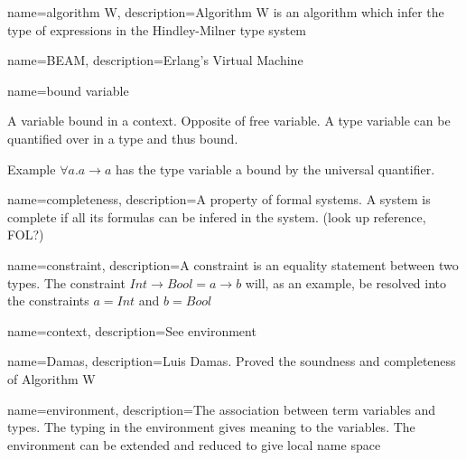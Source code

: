 
%


%




{ name={algorithm W},
  description={Algorithm W is an algorithm which infer the type of expressions in the Hindley-Milner type system}
}

{ name={BEAM},
  description={Erlang's Virtual Machine}
}

{ name={bound variable} }
{A variable bound in a context. Opposite of free variable. A type variable can be quantified over in a type and thus bound.

Example $\forall a . a \to a$ has the type variable a bound by the universal quantifier.}


{ name={completeness},
  description={A property of formal systems. A system is complete if all its formulas can be infered in the system.
(look up reference, FOL?)}
}

{ name={constraint},
  description={A constraint is an equality statement between two types. The constraint $Int \to Bool = a \to b$ will, as an example, be resolved into the constraints $a = Int$ and $b = Bool$}
}

{ name={context},
  description={See environment}
}

{ name={Damas},
  description={Luis Damas. Proved the soundness and completeness of Algorithm W}
} %

{ name={environment},
  description={The association between term variables and types. The typing in the environment gives meaning to the variables. The environment can be extended and reduced to give local name space}
}

